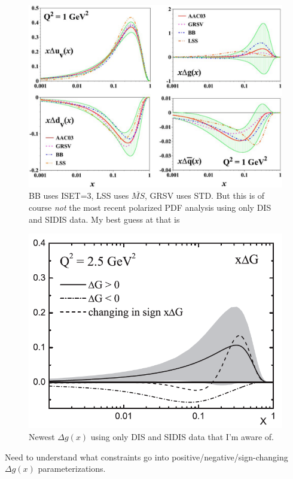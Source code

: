 \begin{figure}
  \includegraphics[width=1.0\textwidth]{figures/aac03}
  \caption{\cite{Hirai:2003pm}  BB \cite{Bluemlein:2002be} uses ISET=3, LSS \cite{Leader:2001kh} uses $\bar{MS}$, GRSV \cite{Gluck:2000dy} uses STD.  But this is of course \textit{not} the most recent polarized PDF analysis using only DIS and SIDIS data.  My best guess at that is \cite{Leader:2006xc}}
\end{figure}

\begin{figure}
  \includegraphics[width=1.0\textwidth]{figures/lss06_deltag}
  \caption{Newest $\Delta g(x)$ using only DIS and SIDIS data that I'm aware of. \cite{Leader:2006xc}}
\end{figure}

Need to understand what constraints go into positive/negative/sign-changing $\Delta g(x)$ parameterizations.
